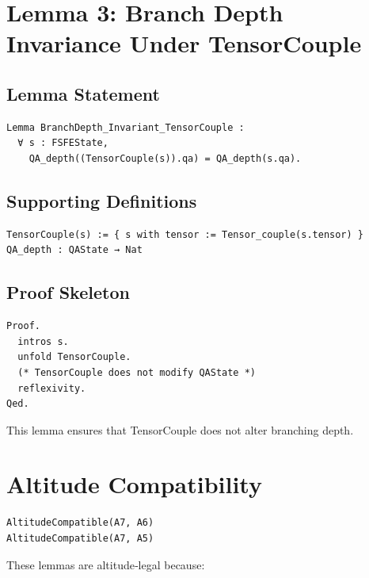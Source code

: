 \documentclass[11pt]{article}
\begin{document}
\section{Lemma 3: Branch Depth Invariance Under TensorCouple}

\subsection{Lemma Statement}

\begin{verbatim}
Lemma BranchDepth_Invariant_TensorCouple :
  ∀ s : FSFEState,
    QA_depth((TensorCouple(s)).qa) = QA_depth(s.qa).
\end{verbatim}

\subsection{Supporting Definitions}

\begin{verbatim}
TensorCouple(s) := { s with tensor := Tensor_couple(s.tensor) }
QA_depth : QAState → Nat
\end{verbatim}

\subsection{Proof Skeleton}

\begin{verbatim}
Proof.
  intros s.
  unfold TensorCouple.
  (* TensorCouple does not modify QAState *)
  reflexivity.
Qed.
\end{verbatim}

This lemma ensures that TensorCouple does not alter branching depth.

\newpage


\section{Altitude Compatibility}

\begin{verbatim}
AltitudeCompatible(A7, A6)
AltitudeCompatible(A7, A5)
\end{verbatim}

These lemmas are altitude‑legal because:
\end{document}
